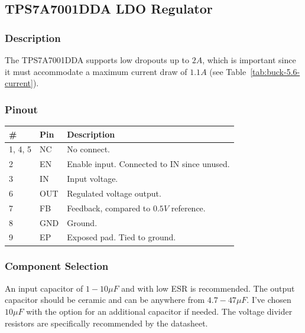 \subsection{TPS7A7001DDA LDO Regulator}
\label{sec:tps7a7001dda}

\subsubsection{Description}
\label{sec:tps7a7001dda-description}

The TPS7A7001DDA supports low dropouts up to $2 \si{A}$, which is important since it must
accommodate a maximum current draw of $1.1 \si{A}$ (see Table~\ref{tab:buck-5.6-current}).

\subsubsection{Pinout}
\label{sec:tps7a7001dda-pinout}

\label{tab:tps7a7001dda-pinout}
\begin{tabularx}{\textwidth}{l l X}
        \caption{TPS7A7001DDA pinout.}                                \\
        \toprule
        \#      & Pin & Description                                   \\
        \midrule
        1, 4, 5 & NC  & No connect.                                   \\
        2       & EN  & Enable input. Connected to IN since unused.   \\
        3       & IN  & Input voltage.                                \\
        6       & OUT & Regulated voltage output.                     \\
        7       & FB  & Feedback, compared to $0.5 \si{V}$ reference. \\
        8       & GND & Ground.                                       \\
        9       & EP  & Exposed pad. Tied to ground.                  \\
        \bottomrule
\end{tabularx}


\subsubsection{Component Selection}
\label{sec:tps7a7001dda-component-selection}

An input capacitor of $1 - 10 \si{\mu F}$ and with low ESR is recommended. The output capacitor
should be ceramic and can be anywhere from $4.7 - 47 \si{\mu F}$. I've chosen $10 \si{\mu F}$ with
the option for an additional capacitor if needed. The voltage divider resistors are specifically
recommended by the datasheet.

